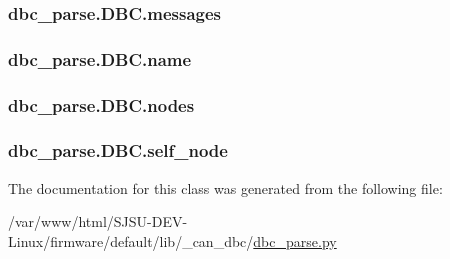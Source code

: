 \subsubsection[{\texorpdfstring{messages}{messages}}]{\setlength{\rightskip}{0pt plus 5cm}dbc\+\_\+parse.\+D\+B\+C.\+messages}\hypertarget{classdbc__parse_1_1DBC_a6c4e80730a556354953e6da7a7bfa878}{}\label{classdbc__parse_1_1DBC_a6c4e80730a556354953e6da7a7bfa878}
\subsubsection[{\texorpdfstring{name}{name}}]{\setlength{\rightskip}{0pt plus 5cm}dbc\+\_\+parse.\+D\+B\+C.\+name}\hypertarget{classdbc__parse_1_1DBC_ae3245dbfb7f61ce997c78979f13df924}{}\label{classdbc__parse_1_1DBC_ae3245dbfb7f61ce997c78979f13df924}
\subsubsection[{\texorpdfstring{nodes}{nodes}}]{\setlength{\rightskip}{0pt plus 5cm}dbc\+\_\+parse.\+D\+B\+C.\+nodes}\hypertarget{classdbc__parse_1_1DBC_a84e171a1b8eb95698e38f0141950b8d6}{}\label{classdbc__parse_1_1DBC_a84e171a1b8eb95698e38f0141950b8d6}
\subsubsection[{\texorpdfstring{self\+\_\+node}{self_node}}]{\setlength{\rightskip}{0pt plus 5cm}dbc\+\_\+parse.\+D\+B\+C.\+self\+\_\+node}\hypertarget{classdbc__parse_1_1DBC_abd457f1296faa1c86877943cc6e57d20}{}\label{classdbc__parse_1_1DBC_abd457f1296faa1c86877943cc6e57d20}


The documentation for this class was generated from the following file\+:\begin{DoxyCompactItemize}
\item 
/var/www/html/\+S\+J\+S\+U-\/\+D\+E\+V-\/\+Linux/firmware/default/lib/\+\_\+can\+\_\+dbc/\hyperlink{dbc__parse_8py}{dbc\+\_\+parse.\+py}\end{DoxyCompactItemize}
